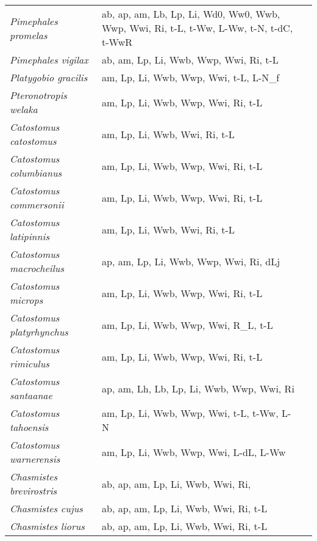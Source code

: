 {\begin{longtable}[c]{p{3.5cm}p{5.5cm}p{5.5cm}}
\emph{Pimephales promelas} &  ab, ap, am, Lb, Lp, Li, Wd0, Ww0, Wwb, Wwp, Wwi, Ri, t-L, t-Ww, L-Ww, t-N, t-dC, t-WwR & \citet{BrauHint1998,Boeh2012,ParrBala2017,GranTonn2002,Wang1986,Wata2007,PantGlen2012,SohoTyle2001,BoroTaly2015,AerlRunn2004,WebeHigg2003} \\
\emph{Pimephales vigilax} &  ab, am, Lp, Li, Wwb, Wwp, Wwi, Ri, t-L & \citet{Park1964} \\
\emph{Platygobio gracilis} &  am, Lp, Li, Wwb, Wwp, Wwi, t-L, L-N\_f & \citet{MartSchm1978,Goul1985} \\
\emph{Pteronotropis welaka} &  am, Lp, Li, Wwb, Wwp, Wwi, Ri, t-L & \citet{JohnKnig1999} \\
\emph{Catostomus catostomus} &  am, Lp, Li, Wwb, Wwi, Ri, t-L & \citet{Bail1969} \\
\emph{Catostomus columbianus} &  am, Lp, Li, Wwb, Wwp, Wwi, Ri, t-L & \citet{Daub1980} \\
\emph{Catostomus commersonii} &  am, Lp, Li, Wwb, Wwp, Wwi, Ri, t-L & \citet{Beam1973,BeckHuts2012} \\
\emph{Catostomus latipinnis} &  am, Lp, Li, Wwb, Wwi, Ri, t-L & \citet{McAdWydo1985} \\
\emph{Catostomus macrocheilus} &  ap, am, Lp, Li, Wwb, Wwp, Wwi, Ri, dLj & \citet{Daub1986,Daub1980} \\
\emph{Catostomus microps} &  am, Lp, Li, Wwb, Wwp, Wwi, Ri, t-L & \citet{MoylMarc1975} \\
\emph{Catostomus platyrhynchus} &  am, Lp, Li, Wwb, Wwp, Wwi, R\_L, t-L & \citet{Haus1968} \\
\emph{Catostomus rimiculus} &  am, Lp, Li, Wwb, Wwp, Wwi, Ri, t-L & \citet{Hohl1981,Haus1968} \\
\emph{Catostomus santaanae} &  ap, am, Lh, Lb, Lp, Li, Wwb, Wwp, Wwi, Ri & \citet{WarrBroo2014,GreeRoss1970,Bail1969} \\
\emph{Catostomus tahoensis} &  am, Lp, Li, Wwb, Wwp, Wwi, t-L, t-Ww, L-N & \citet{KennSigl1978} \\
\emph{Catostomus warnerensis} &  am, Lp, Li, Wwb, Wwp, Wwi, L-dL, L-Ww & \citet{ScheJac02011,Daub1980} \\
\emph{Chasmistes brevirostris} &  ab, ap, am, Lp, Li, Wwb, Wwi, Ri,  & \citet{WarrBurr2014} \\
\emph{Chasmistes cujus} &  ab, ap, am, Lp, Li, Wwb, Wwi, Ri, t-L & \citet{WarrBurr2014,Scop1988} \\
\emph{Chasmistes liorus} &  ab, ap, am, Lp, Li, Wwb, Wwi, Ri, t-L & \citet{WarrBurr2014,Belk1998} \\

\end{longtable}}
